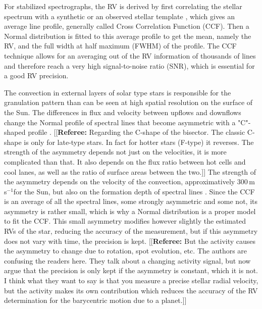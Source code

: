 \documentclass[11pt, oneside]{article}
\def\ms{\hbox{\,m\,s$^{-1}$}}         %
\newcommand{\comment}[1]{{\color{red}[[\textbf{Referee: }#1]]}}
\begin{document}
For stabilized spectrographs, the RV is derived by first correlating the stellar spectrum with a synthetic \citep[][]{Baranne-1996,Pepe-2002a} or an observed stellar template \citep[][]{Anglada-Escude-2012}, which gives an average line profile, generally called Cross Correlation Function (CCF). Then a Normal distribution is fitted to this average profile to get the mean, namely the RV, and the full width at half maximum (FWHM) of the profile. The CCF technique allows for an averaging out of the RV information of thousands of lines and therefore reach a very high signal-to-noise ratio (SNR), which is essential for a good RV precision.

The convection in external layers of solar type stars is responsible for the granulation pattern than can be seen at high spatial resolution on the surface of the Sun. The differences in flux and velocity between upflows and downflows change the Normal profile of spectral lines that become asymmetric with a "C"-shaped profile \citep[][]{Dravins-1981}. 
\comment{Regarding the C-shape of the bisector. The classic C-shape is only for late-type stars. In fact for hotter stars (F-type) it reverses.
The strength of the asymmetry depends not just on the velocities, it is more complicated than that. It also depends on the flux ratio between hot cells and cool lanes, as well as the ratio of surface areas between the two.}
The strength of the asymmetry depends on the velocity of the convection, approximatively 300\ms for the Sun, but also on the formation depth of spectral lines \citep{Gray-2009}. Since the CCF is an average of all the spectral lines, some strongly asymmetric and some not, its asymmetry is rather small, which is why a Normal distribution is a proper model to fit the CCF. This small asymmetry modifies however slightly the estimated RVs of the star, reducing the accuracy of the measurement, but if this asymmetry does not vary with time, the precision is kept.
\comment{But the activity causes the asymmetry to change due to rotation, spot evolution, etc. The authors are confusing the readers here. They talk about a changing activity signal, but now argue that the precision is only kept if the asymmetry is constant, which it is not. I think what they want to say is that you measure a precise stellar radial velocity, but the activity makes its own contribution which reduces the accuracy of the RV determination for the barycentric motion due to a planet.}
\end{document}
